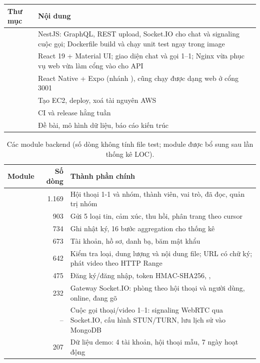 \documentclass[11pt, a4paper]{article}
\begin{document}
\begin{table}[H]
  \centering
  \small
  \begin{tabularx}{\linewidth}{lY}
    \toprule
    \textbf{Thư mục} & \textbf{Nội dung} \\
    \midrule
     & NestJS: GraphQL, REST upload, Socket.IO cho chat và signaling cuộc gọi; Dockerfile build và chạy unit test ngay trong image \\
     & React 19 + Material UI; giao diện chat và gọi 1--1; Nginx vừa phục vụ web vừa làm cổng vào cho API \\
     & React Native + Expo (nhánh ), cũng chạy được dạng web ở cổng 3001 \\
     & Tạo EC2, deploy, xoá tài nguyên AWS \\
     & CI và release hằng tuần \\
     & Đề bài, mô hình dữ liệu, báo cáo kiến trúc \\
    \bottomrule
  \end{tabularx}
\end{table}

\begin{table}[H]
  \centering
  \small
  \caption{Các module backend (số dòng không tính file test; module  được bổ sung sau lần thống kê LOC).}
  \label{tab:modules}
  \begin{tabularx}{\linewidth}{lrY}
    \toprule
    \textbf{Module} & \textbf{Số dòng} & \textbf{Thành phần chính} \\
    \midrule
     & 1.169 & Hội thoại 1-1 và nhóm, thành viên, vai trò, đã đọc, quản trị nhóm \\
     & 903 & Gửi 5 loại tin, cảm xúc, thu hồi, phân trang theo cursor \\
     & 734 & Ghi nhật ký, 16 bước aggregation cho thống kê \\
     & 673 & Tài khoản, hồ sơ, danh bạ, băm mật khẩu  \\
     & 642 & Kiểm tra loại, dung lượng và nội dung file; URL có chữ ký; phát video theo HTTP Range \\
     & 475 & Đăng ký/đăng nhập, token HMAC-SHA256, ,  \\
     & 232 & Gateway Socket.IO: phòng theo hội thoại và người dùng, online, đang gõ \\
     & -- & Cuộc gọi thoại/video 1--1: signaling WebRTC qua Socket.IO, cấu hình STUN/TURN, lưu lịch sử vào MongoDB \\
     & 207 & Dữ liệu demo: 4 tài khoản, hội thoại mẫu, 7 ngày hoạt động \\
    \bottomrule
  \end{tabularx}
\end{table}
\end{document}
